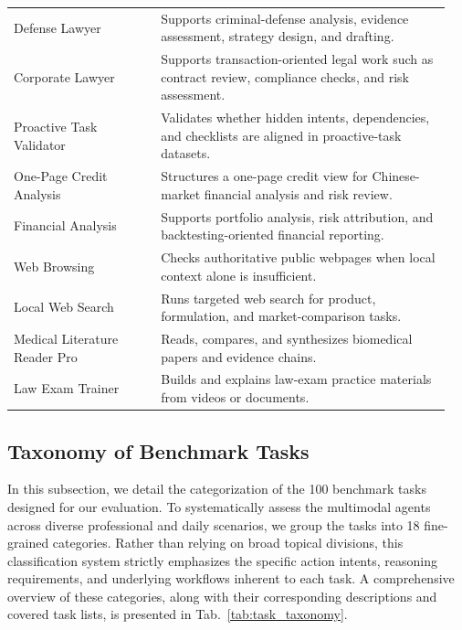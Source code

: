 \begin{longtable}{@{}p{0.32\linewidth}p{0.63\linewidth}@{}}
Defense Lawyer & Supports criminal-defense analysis, evidence assessment, strategy design, and drafting. \\
Corporate Lawyer & Supports transaction-oriented legal work such as contract review, compliance checks, and risk assessment. \\
Proactive Task Validator & Validates whether hidden intents, dependencies, and checklists are aligned in proactive-task datasets. \\
One-Page Credit Analysis & Structures a one-page credit view for Chinese-market financial analysis and risk review. \\
Financial Analysis & Supports portfolio analysis, risk attribution, and backtesting-oriented financial reporting. \\
Web Browsing & Checks authoritative public webpages when local context alone is insufficient. \\
Local Web Search & Runs targeted web search for product, formulation, and market-comparison tasks. \\
Medical Literature Reader Pro & Reads, compares, and synthesizes biomedical papers and evidence chains. \\
Law Exam Trainer & Builds and explains law-exam practice materials from videos or documents. \\

\end{longtable}
\endgroup
























\subsection{Taxonomy of Benchmark Tasks} %
\label{app:taxonomy_of_benchmark_tasks}

In this subsection, we detail the categorization of the 100 benchmark tasks designed for our evaluation. To systematically assess the multimodal agents across diverse professional and daily scenarios, we group the tasks into 18 fine-grained categories. Rather than relying on broad topical divisions, this classification system strictly emphasizes the specific action intents, reasoning requirements, and underlying workflows inherent to each task. A comprehensive overview of these categories, along with their corresponding descriptions and covered task lists, is presented in Tab.~\ref{tab:task_taxonomy}.

